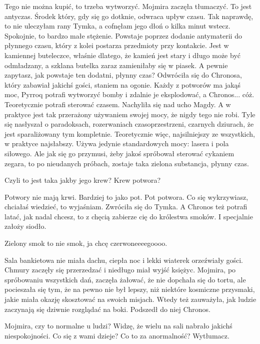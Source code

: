 \ds{} Tego nie można kupić, to trzeba wytworzyć. \dm{} Mojmira zaczęła tłumaczyć. \dm{} To jest antyczas. Środek który, gdy się go dotknie, odwraca upływ czasu. 
Tak naprawdę, to nie uleczyłam rany Tymka, a cofnęłam jego dłoń o kilka minut wstecz. Spokojnie, to bardzo małe stężenie.
Powstaje poprzez dodanie antymaterii do płynnego czasu, który z kolei postarza przedmioty przy kontakcie. 
Jest w kamiennej buteleczce, właśnie dlatego, że kamień jest stary i długo może być odmładzany, a szklana butelka zaraz zamieniłaby się w piasek.
A pewnie zapytasz, jak powstaje ten dodatni, płynny czas? 
\dm{} Odwróciła się do Chronosa, który zabawiał jakichś gości, staniem na ogonie. \dm{} 
Każdy z potworów ma jakąś moc, Pyrroq potrafi wytworzyć bomby i zdalnie je eksplodować, a Chronos... cóż. Teoretycznie potrafi sterować czasem.
\dm{} Nachyliła się nad ucho Magdy. \dm{} A w praktyce jest tak przerażony używaniem swojej mocy, że nigdy tego nie robi.
Tyle się nasłyszał o paradoksach, rozerwaniach czasoprzestrzeni, czarnych dziurach, że jest sparaliżowany tym kompletnie.
Teoretycznie więc, najsilniejszy ze wszystkich, w praktyce najsłabszy.
Używa jedynie standardowych mocy: lasera i pola siłowego.
Ale jak się go przymusi, żeby jakoś spróbował sterować cykaniem zegara, to po nieudanych próbach, zostaje taka zielona substancja, płynny czas. \de{}

\ds{} Czyli to jest taka jakby jego krew? Krew potwora? \de{}

\ds{} Potwory nie mają krwi. Bardziej to jako pot. Pot potwora. Co się wykrzywiasz, chciałaś wiedzieć, to wyjaśniam. \dm{} Zwróciła się do Tymka. \dm{}
A Chronos też potrafi latać, jak nadal chcesz, to z chęcią zabierze cię do królestwa smoków. I specjalnie założy siodło. \de{}

\ds{} Zielony smok to nie smok, ja chcę czerwoneeeegoooo. \de{}

\divider{}

Sala bankietowa nie miała dachu, ciepła noc i lekki wiaterek orzeźwiały gości.
Chmury zaczęły się przerzedzać i niedługo miał wyjść księżyc.
Mojmira, po spróbowaniu wszystkich dań, zaczęła żałować, że nie dopchała się do tortu, ale pocieszała się tym, 
że na pewno nie był lepszy, niż niektóre kosmiczne przysmaki, jakie miała okazję skosztować na swoich misjach.
Wtedy też zauważyła, jak ludzie zaczynają się dziwnie rozglądać na boki. 
Podszedł do niej Chronos.

\ds{} Mojmira, czy to normalne u ludzi? Widzę, że wielu na sali nabrało jakichś niespokojności. Co się z wami dzieje? Co to za anormalność? Wytłumacz. \de{}

